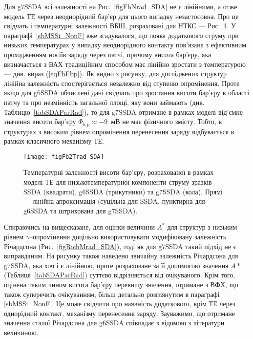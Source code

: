 Для g7SSDA всі залежності на Рис.~\ref{figFbNrad_SDA} не є лінійними, а отже модель ТЕ через неоднорідний бар'єр для цього випадку незастосовна.
Про це свідчать і температурні залежності ВБШ, розраховані для НТКС --- Рис.~\ref{figFb2Trad_SDA}.
У параграфі~\ref{sbMSSi_NonF} вже згадувалося, що поява додаткового струму при низьких температурах у випадку неоднорідного контакту
пов'язана з ефективним проходженням носіїв заряду через патчі, причому висота бар'єру, яка визначається з ВАХ традиційним способом має лінійно зростати з температурою
--- див. вираз (\ref{eqFbFbp}).
Як видно з рисунку, для досліджених структур лінійна залежність спостерігається незалежно від ступеню опромінення.
Проте якщо для g6SSDA обчислені дані свідчать про зростання висоти бар'єру в області патчу та про незмінність загальної площі, яку вони займають (див. Таблицю~\ref{tabSDAParRad}),
то для g7SSDA отримане в рамках моделі від'ємне значення висоти бар'єру $\Phi_{b,p}\approx-9$~мВ не має фізичного змісту.
Тобто, в структурах з високим рівнем опромінення перенесення заряду відбувається в рамках класичного механізму ТЕ.



\begin{figure}
\center
\texttt{[image: figFb2Trad\_SDA]}
\caption{\label{figFb2Trad_SDA}
Температурні залежності висоти бар'єру, розрахованої в рамках моделі ТЕ
для низькотемпературної компоненти струму зразків SSDA (квадрати),
g6SSDA (трикутники) та g7SSDA (кола).
Прямі  --- лінійна апроксимація (суцільна для SSDA, пунктирна для g6SSDA та
штрихована для g7SSDA).
}%
\end{figure}

Спираючись на вищесказане, для оцінки величини $A^*$ для структур з низьким рівнем $\gamma$--опромінення доцільно використовувати
модифіковану залежність Річардсона (Рис.~\ref{figRichMrad_SDA}), тоді як для g7SSDA такий підхід не є виправданим.
На рисунку також наведено звичайну залежність Річардсона для g7SSDA, яка хоч і є лінійною,
проте розраховане за її допомогою значення $A*$ (Таблиця~\ref{tabSDAParRad}) суттєво відрізняється від очікуваного.
Крім того, оцінена таким чином висота бар'єру перевищу значення, отримане з ВФХ, що також суперечить очікуванням,
більш детально розглянутим в параграфі \ref{sbMSSi_NonF}.
Це може свідчити про наявність додаткового, крім ТЕ через однорідний контакт,
механізму перенесення заряду.
Зауважимо, що отримане значення сталої Річардсона для g6SSDA співпадає з відомою з літератури величиною.

